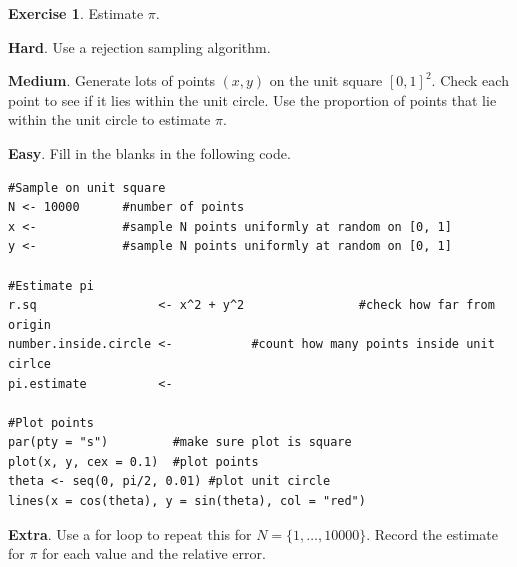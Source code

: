 \documentclass[
]{book}
\theoremstyle{definition}
\theoremstyle{definition}
\theoremstyle{definition}
\newtheorem{exercise}{Exercise}[chapter]
\theoremstyle{definition}
\theoremstyle{remark}
\begin{document}
\begin{exercise}
Estimate \(\pi\).

\textbf{Hard}. Use a rejection sampling algorithm.

\textbf{Medium}. Generate lots of points \((x, y)\) on the unit square \([0, 1]^2\). Check each point to see if it lies within the unit circle. Use the proportion of points that lie within the unit circle to estimate \(\pi\).

\textbf{Easy}. Fill in the blanks in the following code.

\begin{verbatim}
#Sample on unit square
N <- 10000      #number of points
x <-            #sample N points uniformly at random on [0, 1]
y <-            #sample N points uniformly at random on [0, 1]

#Estimate pi
r.sq                 <- x^2 + y^2                #check how far from origin
number.inside.circle <-           #count how many points inside unit cirlce
pi.estimate          <- 

#Plot points
par(pty = "s")         #make sure plot is square
plot(x, y, cex = 0.1)  #plot points
theta <- seq(0, pi/2, 0.01) #plot unit circle
lines(x = cos(theta), y = sin(theta), col = "red")
\end{verbatim}

\textbf{Extra}. Use a for loop to repeat this for \(N = \{1, \ldots, 10000\}\). Record the estimate for \(\pi\) for each value and the relative error.
\end{exercise}
\end{document}
